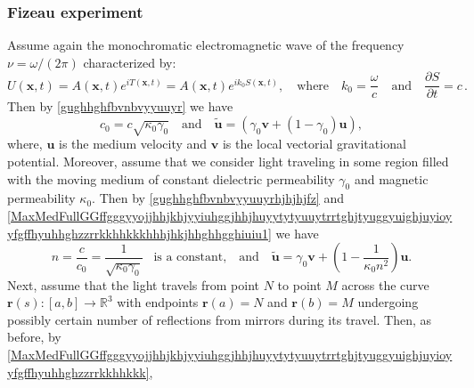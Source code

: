 \documentclass{article}
\theoremstyle{definition}
\theoremstyle{remark}
\renewcommand{\vec}[1]{\mathbf{#1}}
\newcommand{\er}{\eqref}
\newcommand{\er}{\eqref}
\begin{document}
%
%
%

























\subsubsection{Fizeau experiment}\label{seGOfz}
Assume again the monochromatic electromagnetic wave of the frequency
$\nu=\omega/(2\pi)$ characterized by:
\begin{equation}\label{MaxVacFullPPNmmmffffffiuiuhjuughbghhuiiujjhhjjhjhhjhjjhhjhjjhfz}
U(\vec x,t)=A(\vec x,t)e^{iT(\vec x,t)}=A(\vec x,t)e^{ik_0S(\vec
x,t)},\quad\text{where}\quad
k_0=\frac{\omega}{c}\quad\text{and}\quad\frac{\partial S}{\partial
t}=c\,.
\end{equation}
Then by \er{gughhghfbvnbvyyuuyr} we have
\begin{equation}\label{gughhghfbvnbvyyuuyrhjhjhjfz}
c_0=c\sqrt{\kappa_0\gamma_0}\quad\text{and}\quad\vec {\tilde
u}=\left(\gamma_0\vec v+(1-\gamma_0)\vec u\right),
\end{equation}
where, $\vec u$ is the medium velocity and $\vec v$ is the local
vectorial gravitational potential. Moreover, assume that we consider
light traveling in some region filled with the moving medium of
constant dielectric permeability $\gamma_0$ and magnetic
permeability $\kappa_0$. Then by \er{gughhghfbvnbvyyuuyrhjhjhjfz}
and
\er{MaxMedFullGGffgggyyojjhhjkhjyyiuhggjhhjhuyytytyuuytrrtghjtyuggyuighjuyioyyfgffhyuhhghzzrrkkhhkkkhhhjhkjhhghhgghiuiu1}
we have
\begin{equation}\label{gughhghfbvnbvyyuuyrhiyyuiuuhjhfz}
n=\frac{c}{c_0}=\frac{1}{\sqrt{\kappa_0\gamma_0}}\;\;\;\text{is a
constant,}\quad\text{and}\quad\vec {\tilde u}=\gamma_0\vec
v+\left(1-\frac{1}{\kappa_0n^2}\right)\vec u.
\end{equation}
Next, assume that the light travels from point $N$ to point $M$
across the curve $\vec r(s):[a,b]\to\mathbb{R}^3$ with endpoints
$\vec r(a)=N$ and $\vec r(b)=M$ undergoing possibly certain number
of reflections from mirrors during its travel. Then, as before, by
\er{MaxMedFullGGffgggyyojjhhjkhjyyiuhggjhhjhuyytytyuuytrrtghjtyuggyuighjuyioyyfgffhyuhhghzzrrkkhhkkk},
\end{document}
